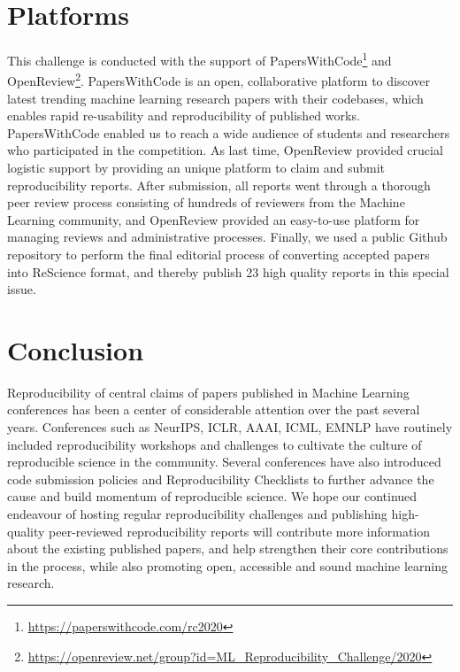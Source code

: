 \section{Platforms}

This challenge is conducted with the support of PapersWithCode\footnote{\href{https://paperswithcode.com/rc2020}{https://paperswithcode.com/rc2020}} and OpenReview\footnote{\href{https://openreview.net/group?id=ML_Reproducibility_Challenge/2020}{https://openreview.net/group?id=ML\_Reproducibility\_Challenge/2020}}. PapersWithCode is an open, collaborative platform to discover latest trending machine learning research papers with their codebases, which enables rapid re-usability and reproducibility of published works. PapersWithCode enabled us to reach a wide audience of students and researchers who participated in the competition. As last time, OpenReview provided crucial logistic support by providing an unique platform to claim and submit reproducibility reports. After submission, all reports went through a thorough peer review process consisting of hundreds of reviewers from the Machine Learning community, and OpenReview provided an easy-to-use platform for managing reviews and administrative processes. Finally, we used a public Github repository to perform the final editorial process of converting accepted papers into ReScience format, and thereby publish 23 high quality reports in this special issue.


\section{Conclusion}

Reproducibility of central claims of papers published in Machine Learning conferences has been a center of considerable attention over the past several years. Conferences such as NeurIPS, ICLR, AAAI, ICML, EMNLP have routinely included reproducibility workshops and challenges to cultivate the culture of reproducible science in the community. Several conferences have also introduced code submission policies and Reproducibility Checklists to further advance the cause and build momentum of reproducible science. We hope our continued endeavour of hosting regular reproducibility challenges and publishing high-quality peer-reviewed reproducibility reports will contribute more information about the existing published papers, and help strengthen their core contributions in the process, while also promoting open, accessible and sound machine learning research.

